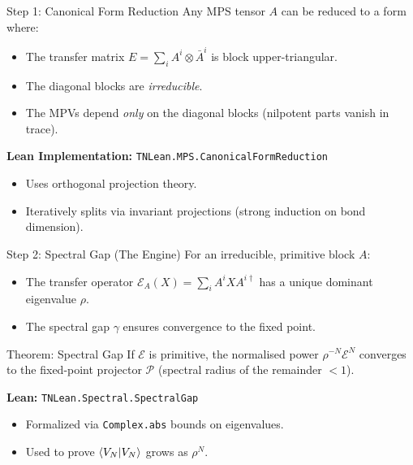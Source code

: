 \documentclass[aspectratio=169,10pt]{beamer}
\begin{document}
\begin{frame}{Step 1: Canonical Form Reduction}
    Any MPS tensor $A$ can be reduced to a form where:
    \begin{itemize}
        \item The transfer matrix $E = \sum_i A^i \otimes \bar{A}^i$ is block upper-triangular.
        \item The diagonal blocks are \emph{irreducible}.
        \item The MPVs depend \emph{only} on the diagonal blocks (nilpotent parts vanish in trace).
    \end{itemize}

    \vspace{0.5em}
    \textbf{Lean Implementation:}
    \texttt{TNLean.MPS.CanonicalFormReduction}
    
    \begin{itemize}
        \item Uses orthogonal projection theory.
        \item Iteratively splits via invariant projections (strong induction on bond dimension).
    \end{itemize}
\end{frame}

\begin{frame}{Step 2: Spectral Gap (The Engine)}
    For an irreducible, primitive block $A$:
    \begin{itemize}
        \item The transfer operator $\mathcal{E}_A(X) = \sum_i A^i X A^{i\dagger}$ has a unique dominant eigenvalue $\rho$.
        \item The spectral gap $\gamma$ ensures convergence to the fixed point.
    \end{itemize}

    \begin{block}{Theorem: Spectral Gap}
        If $\mathcal{E}$ is primitive, the normalised power $\rho^{-N}\mathcal{E}^N$ converges
        to the fixed-point projector $\mathcal{P}$ (spectral radius of the remainder $< 1$).
    \end{block}

    \textbf{Lean:} \texttt{TNLean.Spectral.SpectralGap}
    \begin{itemize}
        \item Formalized via \texttt{Complex.abs} bounds on eigenvalues.
        \item Used to prove $\braket{V_N|V_N}$ grows as $\rho^N$.
    \end{itemize}
\end{frame}
\end{document}
